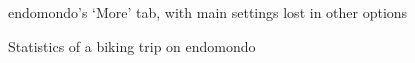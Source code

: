 \begin{figure}[htb!]
    \centering
        \caption{endomondo's `More' tab, with main settings lost in other options \cite{endomondo-more-tab}}
        \label{endomondo-more-tab}
\end{figure}

\begin{figure}[htb!]
    \centering
        \caption{Statistics of a biking trip on endomondo \cite{endomondo-bike-stats-img}}
\end{figure}

